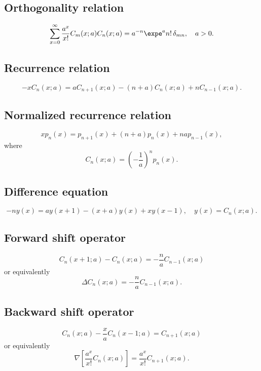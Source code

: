 \documentclass[envcountchap,graybox]{svmono}
\begin{document}
\subsection*{Orthogonality relation}
\begin{equation}
\label{OrtCharlier}
\sum_{x=0}^{\infty}\frac{a^x}{x!}C_m(x;a)C_n(x;a)=
a^{-n}\expe^an!\,\delta_{mn},\quad a > 0.
\end{equation}

\subsection*{Recurrence relation}
\begin{equation}
\label{RecCharlier}
-xC_n(x;a)=aC_{n+1}(x;a)-(n+a)C_n(x;a)+nC_{n-1}(x;a).
\end{equation}

\subsection*{Normalized recurrence relation}
\begin{equation}
\label{NormRecCharlier}
xp_n(x)=p_{n+1}(x)+(n+a)p_n(x)+nap_{n-1}(x),
\end{equation}
where
$$C_n(x;a)=\left(-\frac{1}{a}\right)^np_n(x).$$

\subsection*{Difference equation}
\begin{equation}
\label{dvCharlier}
-ny(x)=ay(x+1)-(x+a)y(x)+xy(x-1),\quad y(x)=C_n(x;a).
\end{equation}

\subsection*{Forward shift operator}
\begin{equation}
\label{shift1CharlierI}
C_n(x+1;a)-C_n(x;a)=-\frac{n}{a}C_{n-1}(x;a)
\end{equation}
or equivalently
\begin{equation}
\label{shift1CharlierII}
\Delta C_n(x;a)=-\frac{n}{a}C_{n-1}(x;a).
\end{equation}

\subsection*{Backward shift operator}
\begin{equation}
\label{shift2CharlierI}
C_n(x;a)-\frac{x}{a}C_n(x-1;a)=C_{n+1}(x;a)
\end{equation}
or equivalently
\begin{equation}
\label{shift2CharlierII}
\nabla\left[\frac{a^x}{x!}C_n(x;a)\right]=\frac{a^x}{x!}C_{n+1}(x;a).
\end{equation}
\end{document}
